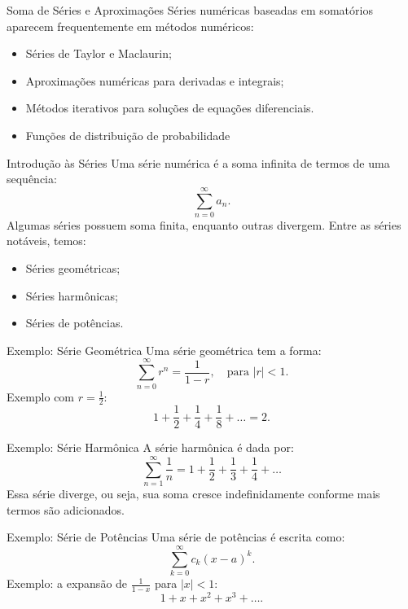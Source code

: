 \documentclass{beamer}
\begin{document}
\begin{frame}{Soma de Séries e Aproximações}
    Séries numéricas baseadas em somatórios aparecem frequentemente em métodos numéricos:
    \begin{itemize}
        \item Séries de Taylor e Maclaurin;
        \item Aproximações numéricas para derivadas e integrais;
        \item Métodos iterativos para soluções de equações diferenciais.
        \item Funções de distribuição de probabilidade
    \end{itemize}
\end{frame}



\begin{frame}{Introdução às Séries}
    Uma série numérica é a soma infinita de termos de uma sequência:
    \[
        \sum_{n=0}^{\infty} a_n.
    \]
    Algumas séries possuem soma finita, enquanto outras divergem. Entre as séries notáveis, temos:
    \begin{itemize}
        \item Séries geométricas;
        \item Séries harmônicas;
        \item Séries de potências.
    \end{itemize}
\end{frame}

\begin{frame}{Exemplo: Série Geométrica}
    Uma série geométrica tem a forma:
    \[
        \sum_{n=0}^{\infty} r^n = \frac{1}{1 - r}, \quad \text{para } |r| < 1.
    \]
    Exemplo com \( r = \displaystyle \frac{1}{2} \):
    \[
        1 + \frac{1}{2} + \frac{1}{4} + \frac{1}{8} + \dots = 2.
    \]
\end{frame}

\begin{frame}{Exemplo: Série Harmônica}
    A série harmônica é dada por:
    \[
        \sum_{n=1}^{\infty} \frac{1}{n} = 1 + \frac{1}{2} + \frac{1}{3} + \frac{1}{4} + \dots
    \]
    Essa série diverge, ou seja, sua soma cresce indefinidamente conforme mais termos são adicionados.
\end{frame}

\begin{frame}{Exemplo: Série de Potências}
    Uma série de potências é escrita como:
    \[
        \sum_{k=0}^{\infty} c_k (x-a)^k.
    \]
    Exemplo: a expansão de \( \frac{1}{1-x} \) para \( |x| < 1 \):
    \[
        1 + x + x^2 + x^3 + \dots.
    \]
\end{frame}
\end{document}
